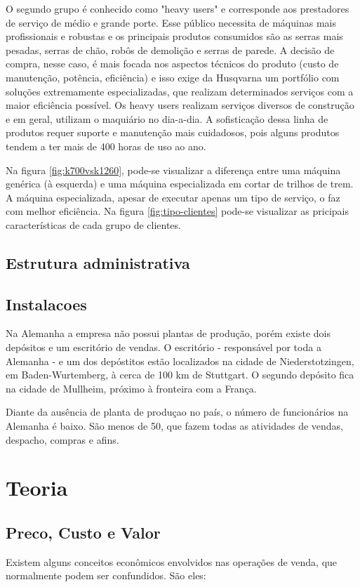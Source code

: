 \documentclass[12pt]{article}
\begin{document}
	O segundo grupo é conhecido como "heavy users" e corresponde aos prestadores de serviço de médio e grande porte. Esse público necessita de máquinas mais profissionais e robustas e os principais produtos consumidos são as serras mais pesadas, serras de chão, robôs de demolição e serras de parede. A decisão de compra, nesse caso, é mais focada nos aspectos técnicos do produto (custo de manutenção, potência, eficiência) e isso exige da Husqvarna um portfólio com soluções extremamente especializadas, que realizam determinados serviços com a maior eficiência possível. Os heavy users realizam serviços diversos de construção e em geral, utilizam o maquiário no dia-a-dia. A sofisticação dessa linha de produtos requer suporte e manutenção mais cuidadosos, pois alguns produtos tendem a ter mais de 400 horas de uso ao ano. 
	
	Na figura \ref{fig:k700vsk1260}, pode-se visualizar a diferença entre uma máquina genérica (à esquerda) e uma máquina especializada em cortar de trilhos de trem. A máquina especializada, apesar de executar apenas um tipo de serviço, o faz com melhor eficiência. Na figura \ref{fig:tipo-clientes} pode-se visualizar as pricipais características de cada grupo de clientes.
	


\subsection{Estrutura administrativa}


\subsection{Instalacoes}
Na Alemanha a empresa não possui plantas de produção, porém existe dois depósitos e um escritório de vendas. O escritório - responsável por toda a Alemanha - e um dos depóstitos estão localizados na cidade de Niederstotzingen, em Baden-Wurtemberg, à cerca de 100 km de Stuttgart. O segundo depósito fica na cidade de Mullheim, próximo à fronteira com a França.

Diante da ausência de planta de produçao no país, o número de funcionários na Alemanha é baixo. São menos de 50, que fazem todas as atividades de vendas, despacho, compras e afins.

\section{Teoria}

\subsection{Preco, Custo e Valor}
Existem alguns conceitos econômicos envolvidos nas operações de venda, que normalmente podem ser confundidos. São eles:
\end{document}
